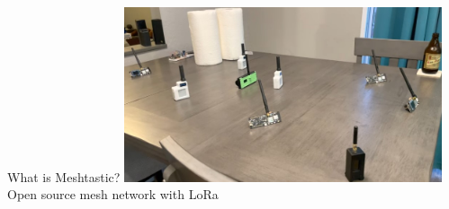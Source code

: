 





\begin{frame}{What is Meshtastic?}
    \centering
    \includegraphics[height=0.7\textheight,width=0.7\textwidth,keepaspectratio]{images/rtt/mesh.jpg}\\
    Open source mesh network with LoRa
\end{frame}

